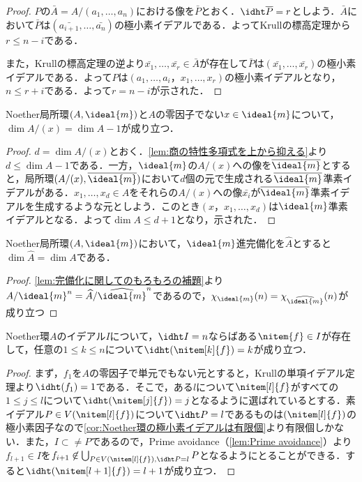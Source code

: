 \begin{proof}
	$P$の$\bar{A}=A/(a_1,\dots,a_n)$における像を$\bar{P}$とおく．$\idht \bar{P}=r$としよう．$\bar{A}$において$\bar{P}$は$(\bar{a_{i+1}},\dots,\bar{a_n})$の極小素イデアルである．よってKrullの標高定理から$r\leq n-i$である．
	
	また，Krullの標高定理の逆より$\bar{x_1},\dots,\bar{x_r}\in\bar{A}$が存在して$\bar{P}$は$(\bar{x_1},\dots,\bar{x_r})$の極小素イデアルである．よって$P$は$(a_1,\dots,a_i，x_1,\dots,x_r)$の極小素イデアルとなり，$n\leq r+i$である．よって$r=n-i$が示された．
\end{proof}

\begin{prop}\label{prop:dim A/xA=dim A-1}
	Noether局所環$(A,\ideal{m})$と$A$の零因子でない$x\in\ideal{m}$について，$\dim A/(x)=\dim A-1$が成り立つ．
\end{prop}

\begin{proof}
	$d=\dim A/(x)$とおく．\ref{lem:商の特性多項式を上から抑える}より$d\leq \dim A-1$である．一方，$\ideal{m}$の$A/(x)$への像を$\bar{\ideal{m}}$とすると，局所環$(A/(x),\bar{\ideal{m}})$において$d$個の元で生成される$\bar{\ideal{m}}$準素イデアルがある．$x_1,\dots,x_d\in A$をそれらの$A/(x)$への像$\bar{x_i}$が$\bar{\ideal{m}}$準素イデアルを生成するような元としよう．このとき$(x，x_1,\dots,x_d)$は$\ideal{m}$準素イデアルとなる．よって$\dim A\leq d+1$となり，示された．
\end{proof}

\begin{thm}
	Noether局所環$(A,\ideal{m})$において，$\ideal{m}$進完備化を$\widehat{A}$とすると$\dim\widehat{A}=\dim A$である．
\end{thm}

\begin{proof}
	\ref{lem:完備化に関してのもろもろの補題}より$A/\ideal{m}^n=\widehat{A}/{\widehat{\ideal{m}}}^n$であるので，$\chi_{\ideal{m}}(n)=\chi_{\widehat{\ideal{m}}}(n)$が成り立つ
\end{proof}

\begin{prop}
	Noether環$A$のイデアル$I$について，$\idht I=n$ならばある$\nitem{f}\in I$が存在して，任意の$1\leq k\leq n$について$\idht (\nitem[k]{f})=k$が成り立つ．
\end{prop}

\begin{proof}
	まず，$f_1$を$A$の零因子で単元でもない元とすると，Krullの単項イデアル定理より$\idht (f_1)=1$である．そこで，ある$l$について$\nitem[l]{f}$がすべての$1\leq j\leq l$について$\idht (\nitem[j]{f})=j$となるように選ばれているとする．素イデアル$P\in V(\nitem[l]{f})$について$\idht P=l$であるものは$(\nitem[l]{f})$の極小素因子なので\ref{cor:Noether環の極小素イデアルは有限個}より有限個しかない．また，$I\subset\neq P$であるので，Prime avoidance（\ref{lem:Prime avoidance}）より$f_{l+1}\in I$を$f_{i+1}\not\in\bigcup_{P\in V(\nitem[l]{f}),\idht P=l} P$となるようにとることができる．すると$\idht (\nitem[l+1]{f})=l+1$が成り立つ．
\end{proof}

